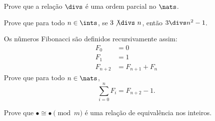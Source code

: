 \begin{exercise}
    Prove que a relação $\divs$ é uma ordem parcial no $\nats$.
\end{exercise}

\begin{exercise}
    Prove que para todo $n \in \ints$, se $3\not{\divs} \ n$, então $3 \divs n^2 - 1$.
\end{exercise}

\begin{exercise}
    Os nũmeros Fibonacci são definidos recursivamente assim:
    $$
        \begin{aligned}
            F_0 &= 0\\
            F_1 &= 1\\
            F_{n+2} &= F_{n+1} + F_n
        \end{aligned}
    $$
    Prove que para todo $n \in \nats$,
    $$
       \sum_{i=0}^{n} F_i = F_{n+2} - 1.
    $$
\end{exercise}

\begin{homework}
	Prove que $\bullet \cong \bullet \pmod m$ é uma relação de equivalência nos inteiros.
\end{homework}
